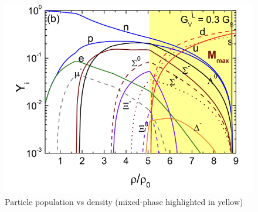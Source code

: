 \begin{figure}[H]
    \centering
    \includegraphics[width=.6\textwidth]{img/mixed_phase.png}
    \caption{Particle population vs density (mixed-phase highlighted in yellow) \cite{deconfinement}}
    \label{mixed}
\end{figure}